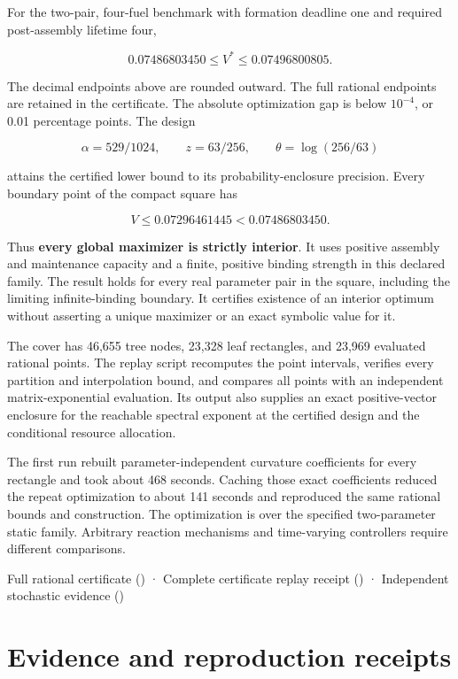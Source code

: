 \documentclass[
  11pt,
]{article}
\begin{document}
For the two-pair, four-fuel benchmark with formation deadline one and
required post-assembly lifetime four,

\[
0.07486803450\le V^*\le0.07496800805.
\]

The decimal endpoints above are rounded outward. The full rational
endpoints are retained in the certificate. The absolute optimization gap
is below \(10^{-4}\), or 0.01 percentage points. The design

\[
\alpha=529/1024,\qquad z=63/256,\qquad
\theta=\log(256/63)
\]

attains the certified lower bound to its probability-enclosure
precision. Every boundary point of the compact square has

\[
V\le0.07296461445<0.07486803450.
\]

Thus \textbf{every global maximizer is strictly interior}. It uses
positive assembly and maintenance capacity and a finite, positive
binding strength in this declared family. The result holds for every
real parameter pair in the square, including the limiting
infinite-binding boundary. It certifies existence of an interior optimum
without asserting a unique maximizer or an exact symbolic value for it.

The cover has 46,655 tree nodes, 23,328 leaf rectangles, and 23,969
evaluated rational points. The replay script recomputes the point
intervals, verifies every partition and interpolation bound, and
compares all points with an independent matrix-exponential evaluation.
Its output also supplies an exact positive-vector enclosure for the
reachable spectral exponent at the certified design and the conditional
resource allocation.

The first run rebuilt parameter-independent curvature coefficients for
every rectangle and took about 468 seconds. Caching those exact
coefficients reduced the repeat optimization to about 141 seconds and
reproduced the same rational bounds and construction. The optimization
is over the specified two-parameter static family. Arbitrary reaction
mechanisms and time-varying controllers require different comparisons.

Full rational certificate () · Complete
certificate replay receipt
() · Independent
stochastic evidence ()

\section{Evidence and reproduction
receipts}\label{evidence-and-reproduction-receipts}
\end{document}
